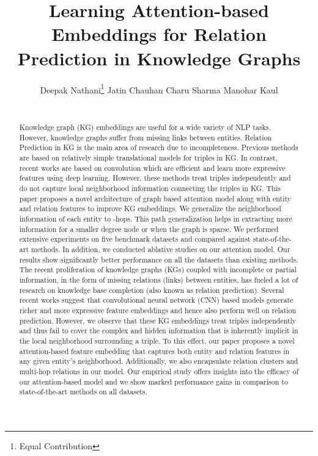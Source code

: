 \documentclass[11pt,a4paper]{article}
\title{Learning Attention-based Embeddings for Relation Prediction in Knowledge Graphs}
\author{Deepak Nathani\thanks{\hspace{0.01in} Equal Contribution} \qquad
  Jatin Chauhan\footnotemark[1]  \qquad
  Charu Sharma\footnotemark[1]  \qquad
  Manohar Kaul \\
  \affaddr{Department of Computer Science and Engineering, IIT Hyderbad} \\
 \email{\{deepakn1019,chauhanjatin100,charusharma1991\}@gmail.com, mkaul@iith.ac.in}
}
\date{}
\begin{document}
\maketitle
\begin{abstract}
Knowledge graph (KG) embeddings are useful for a wide variety of NLP tasks. However, knowledge graphs suffer from missing links between entities. Relation Prediction in KG is the main area of research due to incompleteness. Previous methods are based on relatively simple translational models for triples in KG. In contrast, recent works are based on 
convolution which are efficient and learn more expressive features using deep learning. However, these methods treat triples independently and do not capture local neighborhood information connecting the triples in KG.
This paper proposes a novel architecture of graph based attention model along with entity and relation features to improve KG embeddings. We generalize the neighborhood information of each entity to -hops. This path generalization helps in extracting more information 
for a smaller degree node or when the graph is sparse. We performed extensive experiments on five benchmark datasets and compared against state-of-the-art methods.  In addition, we conducted ablative studies on our attention model. Our results show significantly better performance on all the datasets than existing methods.
\fi
The recent proliferation of knowledge graphs (KGs) coupled with incomplete or partial information, in the form of missing relations (links) between entities, has fueled a lot of research on knowledge base completion (also known as relation prediction). Several recent works suggest that convolutional neural network (CNN) based models generate richer and more expressive feature embeddings and hence also perform well on relation prediction. 
However, we observe that these KG embeddings treat triples independently and thus fail to cover the complex and hidden information that is inherently implicit in the local neighborhood surrounding a triple. 
To this effect, our paper proposes a novel attention-based feature embedding that captures both entity and relation features in any given entity's neighborhood. Additionally, we also encapsulate relation clusters and multi-hop relations 
in our model. Our empirical study offers insights into the efficacy of our attention-based model and we show marked performance gains in comparison to state-of-the-art methods on all datasets.

\end{abstract}
\end{document}

